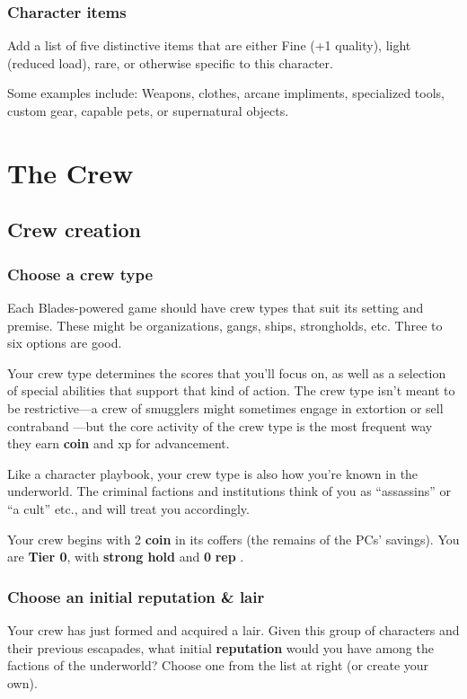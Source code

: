 \documentclass[11pt,oneside]{book}
\newcommand{\gameterm}[1]{\textbf{#1}}
\begin{document}
\section{Character items}

Add a list of five distinctive items that are either Fine (+1 quality), light (reduced load), rare, or otherwise specific to this character.

Some examples include: Weapons, clothes, arcane impliments, specialized tools, custom gear, capable pets, or supernatural objects.

\part{The Crew}

\chapter{Crew creation}

\section{Choose a crew type}

Each Blades-powered game should have crew types that suit its setting and premise. These might be organizations, gangs, ships, strongholds, etc. Three to six options are good.

Your crew type determines the scores that you’ll focus on, as well as a selection of special abilities that support that kind of action. The crew type isn’t meant to be restrictive---a crew of smugglers might sometimes engage in extortion  or sell contraband ---but the core activity of the crew type is the most frequent way they earn \gameterm{coin}  and xp for advancement.

Like a character playbook, your crew type is also how you’re known in the underworld. The criminal factions and institutions think of you as “assassins” or “a cult” etc., and will treat you accordingly.

Your crew begins with 2 \gameterm{coin}  in its coffers (the remains of the PCs’ savings). You are \textbf{Tier 0}, with \textbf{strong hold} and \textbf{0} \gameterm{rep} .

\section{Choose an initial reputation \& lair}

Your crew has just formed and acquired a lair. Given this group of characters and their previous escapades, what initial \textbf{reputation} would you have among the factions of the underworld? Choose one from the list at right (or create your own).
\end{document}
